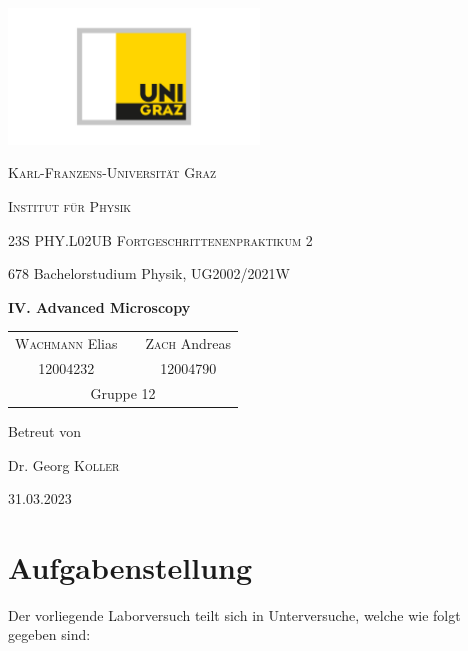 \documentclass[english, ngerman]{scrartcl}
\begin{document}
\begin{titlepage}
    \centering
    \includegraphics[width=0.5\textwidth]{../../99_Misc/Logo_KF.pdf}\par\vspace{0.8cm}
    {\scshape\LARGE{Karl-Franzens-Universität Graz}\par}
    {\scshape\LARGE{Institut für Physik}\par}
    \vspace{1cm}
    {\scshape\Large{23S PHY.L02UB Fortgeschrittenenpraktikum 2}\par}
    678 Bachelorstudium Physik, UG2002/2021W\par
    \vspace{1.5cm}
    {\huge\bfseries IV. Advanced Microscopy\par}
    \vspace{2cm}
    \begin{table}[H]
        \centering
        \begin{tabular}{c c c}
            \Large \textsc{Wachmann} Elias &  & \Large \textsc{Zach} Andreas \\
            \Large 12004232                &  & \Large 12004790              \\
            \multicolumn{3}{c}{Gruppe 12}
        \end{tabular}
    \end{table}
    \vfill
    \Large Betreut von\par
    Dr. Georg \textsc{Koller}
    \vfill
    {\large 31.03.2023\par}
\end{titlepage}

\clearpage
\tableofcontents
\newpage

\section[Aufgabenstellung]{Aufgabenstellung \cite{ref:angabe}}
\label{sec:aufgabenstellung}

Der vorliegende Laborversuch teilt sich in Unterversuche, welche wie folgt gegeben sind:
\end{document}
